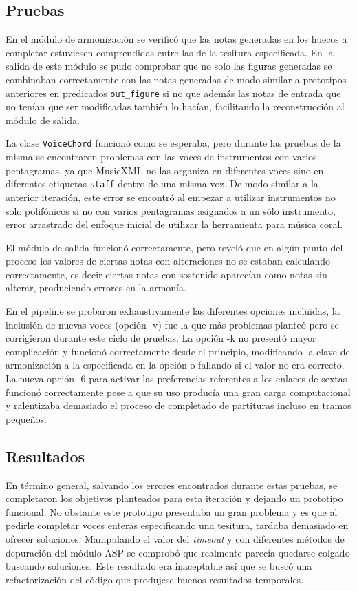 \subsection{Pruebas}
En el módulo de armonización se verificó que las notas generadas en los huecos a completar estuviesen comprendidas entre las de la tesitura especificada. En la salida de este módulo se pudo comprobar que no solo las figuras generadas se combinaban correctamente con las notas generadas de modo similar a prototipos anteriores en predicados \texttt{out\_figure} si no que además las notas de entrada que no tenían que ser modificadas también lo hacían, facilitando la reconstrucción al módulo de salida.

La clase \texttt{VoiceChord} funcionó como se esperaba, pero durante las pruebas de la misma se encontraron problemas con las voces de instrumentos con varios pentagramas, ya que MusicXML no las organiza en diferentes voces sino en diferentes etiquetas \texttt{staff} dentro de una misma voz. De modo similar a la anterior iteración, este error se encontró al empezar a utilizar instrumentos no solo polifónicos si no con varios pentagramas asignados a un sólo instrumento, error arrastrado del enfoque inicial de utilizar la herramienta para música coral.

El módulo de salida funcionó correctamente, pero reveló que en algún punto del proceso los valores de ciertas notas con alteraciones no se estaban calculando correctamente, es decir ciertas notas con sostenido aparecían como notas sin alterar, produciendo errores en la armonía.

En el pipeline se probaron exhaustivamente las diferentes opciones incluidas, la inclusión de nuevas voces (opción -v) fue la que más problemas planteó pero se corrigieron durante este ciclo de pruebas. La opción -k no presentó mayor complicación y funcionó correctamente desde el principio, modificando la clave de armonización a la especificada en la opción o fallando si el valor no era correcto. La nueva opción -6 para activar las preferencias referentes a los enlaces de sextas funcionó correctamente pese a que su uso producía una gran carga computacional y ralentizaba demasiado el proceso de completado de partituras incluso en tramos pequeños.

\subsection{Resultados}
En término general, salvando los errores encontrados durante estas pruebas, se completaron los objetivos planteados para esta iteración y dejando un prototipo funcional. No obstante este prototipo presentaba un gran problema y es que al pedirle completar voces enteras especificando una tesitura, tardaba demasiado en ofrecer soluciones. Manipulando el valor del \textit{timeout} y con diferentes métodos de depuración del módulo ASP se comprobó que realmente parecía quedarse colgado buscando soluciones. Este resultado era inaceptable así que se buscó una refactorización del código que produjese buenos resultados temporales.

